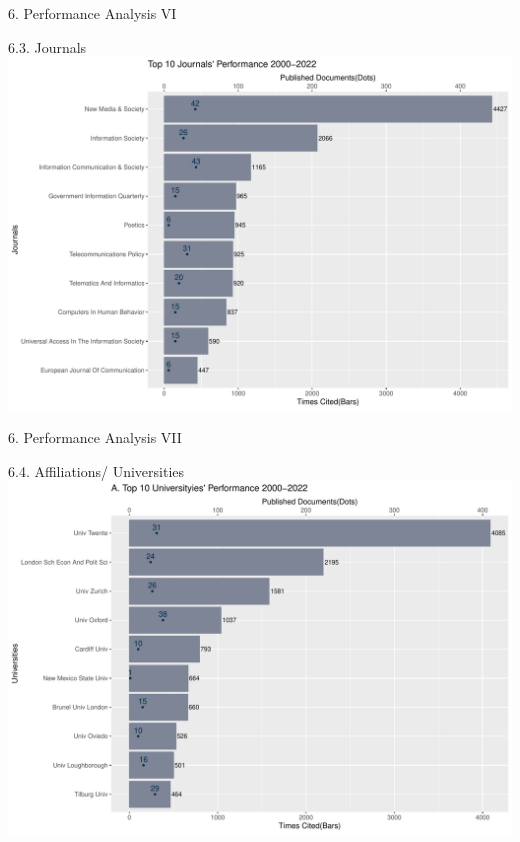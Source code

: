 \documentclass[
  ignorenonframetext,
]{beamer}
\begin{document}
\begin{frame}{6. Performance Analysis VI}
\protect\hypertarget{performance-analysis-vi}{}
\begin{block}{6.3. Journals}
\protect\hypertarget{journals}{}
\includegraphics{Presentation_bibliometric_files/figure-beamer/Influencial SO-1.pdf}
\end{block}
\end{frame}

\begin{frame}{6. Performance Analysis VII}
\protect\hypertarget{performance-analysis-vii}{}
\begin{block}{6.4. Affiliations/ Universities}
\protect\hypertarget{affiliations-universities}{}
\includegraphics{Presentation_bibliometric_files/figure-beamer/Influencial UN-1.pdf}
\end{block}
\end{frame}
\end{document}
